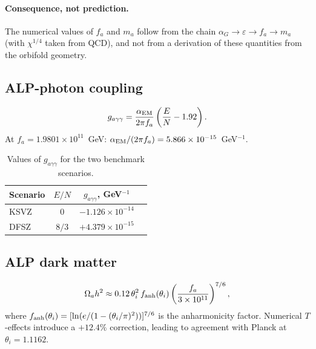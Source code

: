 \documentclass[12pt,a4paper]{article}
\numberwithin{equation}{section}
\begin{document}
\paragraph{Consequence, not prediction.}
The numerical values of \(f_a\) and \(m_a\) follow from the
chain \(\alpha_G \to \varepsilon \to f_a \to m_a\) (with \(\chi^{1/4}\) taken
from QCD), and not from a derivation of these quantities from the orbifold
geometry.

\subsection{ALP-photon coupling}
\begin{equation}
g_{a\gamma\gamma} = \frac{\alpha_{\rm EM}}{2\pi f_a}\left(\frac{E}{N} - 1.92\right).
\end{equation}
At \(f_a = 1.9801\times10^{11}\)~GeV: \(\alpha_{\rm EM}/(2\pi f_a) = 5.866\times10^{-15}\)~GeV\(^{-1}\).
\begin{table}[H]
\centering
\caption{Values of \(g_{a\gamma\gamma}\) for the two benchmark scenarios.}
\begin{tabular}{lccc}
\toprule
Scenario & $E/N$ & \(g_{a\gamma\gamma}\), GeV\(^{-1}\) \\
\midrule
KSVZ & \(0\)   & \(-1.126\times10^{-14}\) \\
DFSZ & \(8/3\) & \(+4.379\times10^{-15}\) \\
\bottomrule
\end{tabular}
\end{table}

\subsection{ALP dark matter}
\begin{equation}
\Omega_a h^2 \approx 0.12\,\theta_i^2\, f_{\rm anh}(\theta_i)
\left(\frac{f_a}{3\times10^{11}}\right)^{7/6},
\end{equation}
where \(f_{\rm anh}(\theta_i) = [\ln(e/(1-(\theta_i/\pi)^2))]^{7/6}\) is the anharmonicity factor. Numerical $T$-effects introduce a \(+12.4\%\) correction, leading to agreement with Planck at \(\theta_i = 1.1162\).
\end{document}
